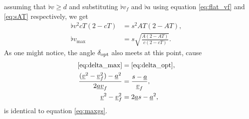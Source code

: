assuming that $\flat{v} \ge d$ and substituting $\flat{v}_f$ and $\flat{a}$ using equation \eqref{eq:flat_vf} and \eqref{eq:sAT} respectively, we get
\begin{align*}
\flat{v}^2 cT(2 - cT) &= s^2 AT(2 - AT),\\
\flat{v}_{\max} &= s \sqrt{\frac{A(2 - AT)}{c(2 - cT)}}.
\end{align*}
As one might notice, the angle $\delta_{\operatorname{opt}}$ also meets at this point, cause
\begin{align*}
\eqref{eq:delta_max} &= \eqref{eq:delta_opt},\\
\frac{(\flat{v}^2 - \flat{v}_f^2) - \flat{a}^2}{2 \flat{a} \flat{v}_f} &= \frac{s - \flat{a}}{\flat{v}_f},\\
\flat{v}^2 - \flat{v}_f^2 &= 2 \flat{a} s - \flat{a}^2,
\end{align*}
is identical to equation \eqref{eq:maxgs}.
